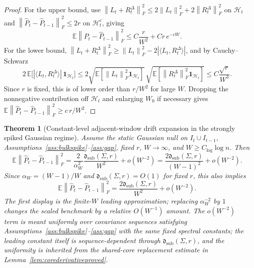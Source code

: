 \documentclass[11pt]{article}
\theoremstyle{tightplain}
\newtheorem{theorem}{Theorem}[section]
\theoremstyle{tightdef}
\newcommand{\E}{\mathbb E}
\newcommand{\norm}[1]{\left\lVert #1 \right\rVert}
\newcommand{\abs}[1]{\left\lvert #1 \right\rvert}
\newcommand{\one}{\mathbf 1}
\newcommand{\dsub}{\mathfrak d_{\mathrm{sub}}}
\begin{document}
\begin{proof}
For the upper bound, use
$\norm{L_t+R_t^\Delta}_F^2\le 2\norm{L_t}_F^2+2\norm{R_t^\Delta}_F^2$ on
$\mathcal H_t$ and $\norm{\widehat P_t-\widehat P_{t-1}}_F^2\le 2r$ on
$\mathcal H_t^c$, giving
\[
\E\norm{\widehat P_t-\widehat P_{t-1}}_F^2
\le
C\frac r{W^2}+C r\, e^{-cW}.
\]
For the lower bound,
$\norm{L_t+R_t^\Delta}_F^2\ge\norm{L_t}_F^2-2\abs{\langle L_t,R_t^\Delta\rangle}$,
and by Cauchy--Schwarz
\[
2\,\E\bigl[\abs{\langle L_t,R_t^\Delta\rangle}\,\one_{\mathcal H_t}\bigr]
\le
2\sqrt{\E[\norm{L_t}_F^2\one_{\mathcal H_t}]}\,\sqrt{\E[\norm{R_t^\Delta}_F^2\one_{\mathcal H_t}]}
\le
C\frac{\sqrt r}{W^3}.
\]
Since $r$ is fixed, this is of lower order than $r/W^2$ for large $W$. Dropping
the nonnegative contribution off $\mathcal H_t$ and enlarging $W_0$ if necessary
gives $\E\norm{\widehat P_t-\widehat P_{t-1}}_F^2\ge c\,r/W^2$.
\end{proof}

\begin{theorem}[Constant-level adjacent-window drift expansion in the strongly spiked Gaussian regime]
\label{thm:adjacentconstantproved}
Assume the static Gaussian null on $I_t\cup I_{t-1}$,
Assumptions~\ref{ass:bulkspike}--\ref{ass:gap}, fixed $r$, $W\to\infty$, and
$W\ge C_{\log}\log n$. Then
\[
\E\norm{\widehat P_t-\widehat P_{t-1}}_F^2
=\frac{2}{\alpha_W^2}
\frac{\dsub(\Sigma,r)}{W^2}
+
o(W^{-2})
=
\frac{2\dsub(\Sigma,r)}{(W-1)^2}
+
o(W^{-2}).
\]
Since $\alpha_W=(W-1)/W$ and
$\dsub(\Sigma,r)=O(1)$ for fixed $r$, this also implies
\[
\E\norm{\widehat P_t-\widehat P_{t-1}}_F^2
=\frac{2\dsub(\Sigma,r)}{W^2}
+
o(W^{-2}).
\]
The first display is the finite-$W$ leading approximation; replacing
$\alpha_W^{-2}$ by $1$ changes the scaled benchmark by a relative $O(W^{-1})$
amount. The $o(W^{-2})$ term is meant uniformly over covariance sequences
satisfying Assumptions~\ref{ass:bulkspike}--\ref{ass:gap} with the same fixed
spectral constants; the leading constant itself is sequence-dependent through
$\dsub(\Sigma,r)$, and the uniformity is inherited from the
shared-core replacement estimate in Lemma~\ref{lem:corederivativeproved}.
\end{theorem}
\end{document}
